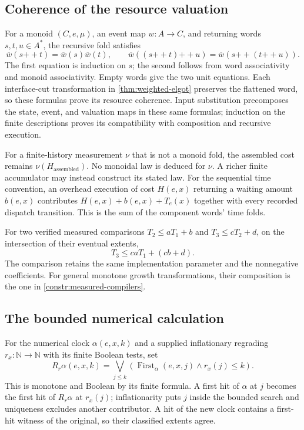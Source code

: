 \documentclass[11pt,a4paper]{article}
\numberwithin{algorithm}{section}
\numberwithin{equation}{section}
\theoremstyle{definition}
\theoremstyle{remark}
\theoremstyle{plain}
\newcommand{\N}{\mathbb N}
\theoremstyle{definition}
\theoremstyle{plain}
\begin{document}
\subsection{Coherence of the resource valuation}
For a monoid $(C,e,\mu)$, an event map $w:A\to C$, and returning words
$s,t,u\in A^*$, the recursive fold satisfies
\[
 \overline w(s{+\!+}t)=\overline w(s)\overline w(t),\qquad
 \overline w((s{+\!+}t){+\!+}u)
 =\overline w(s{+\!+}(t{+\!+}u)).
\]
The first equation is induction on $s$; the second follows from word
associativity and monoid associativity. Empty words give the two unit
equations. Each interface-cut transformation in
\cref{thm:weighted-elgot} preserves the flattened word, so these formulas
prove its resource coherence. Input substitution precomposes the state,
event, and valuation maps in these same formulas; induction on the
finite descriptions proves its compatibility with composition and
recursive execution.

For a finite-history measurement $\nu$ that is not a monoid fold, the
assembled cost remains $\nu(H_{\mathrm{assembled}})$. No monoidal law
is deduced for $\nu$. A richer finite accumulator may instead construct
its stated law. For the sequential time convention, an overhead
execution of cost $H(e,x)$ returning a waiting amount $b(e,x)$ contributes
$H(e,x)+b(e,x)+T_e(x)$ together with every recorded dispatch transition.
This is the sum of the component words' time folds.

For two verified measured comparisons
$T_2\le aT_1+b$ and $T_3\le cT_2+d$, on the intersection of their
eventual extents,
\[
 T_3\le caT_1+(cb+d).
\]
The comparison retains the same implementation parameter and the
nonnegative coefficients. For general monotone growth transformations,
their composition is the one in \cref{constr:measured-compilers}.

\subsection{The bounded numerical calculation}
For the numerical clock $\alpha(e,x,k)$ and a supplied inflationary
regrading $r_x:\N\to\N$ with its finite Boolean tests, set
\[
 R_r\alpha(e,x,k)=\bigvee_{j\le k}
    (\operatorname{First}_\alpha(e,x,j)\wedge r_x(j)\le k).
\]
This is monotone and Boolean by its finite formula. A first hit of
$\alpha$ at $j$ becomes the first hit of $R_r\alpha$ at $r_x(j)$;
inflationarity puts $j$ inside the bounded search and uniqueness excludes
another contributor. A hit of the new clock contains a first-hit witness
of the original, so their classified extents agree.
\end{document}
